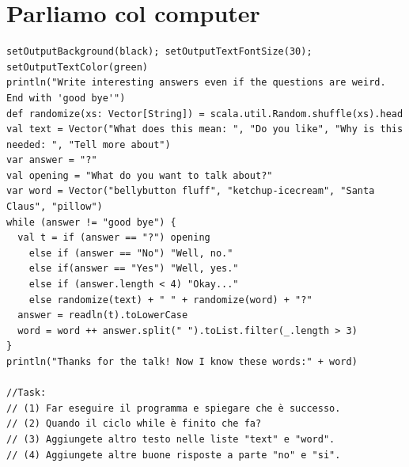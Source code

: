 \chapter{Parliamo col computer}
\begin{lstlisting}[basicstyle={\ttfamily\fontsize{13}{16}\selectfont},numbers=none]
setOutputBackground(black); setOutputTextFontSize(30); setOutputTextColor(green)
println("Write interesting answers even if the questions are weird. End with 'good bye'")
def randomize(xs: Vector[String]) = scala.util.Random.shuffle(xs).head
val text = Vector("What does this mean: ", "Do you like", "Why is this needed: ", "Tell more about")
var answer = "?"
val opening = "What do you want to talk about?"
var word = Vector("bellybutton fluff", "ketchup-icecream", "Santa Claus", "pillow") 
while (answer != "good bye") {
  val t = if (answer == "?") opening 
    else if (answer == "No") "Well, no." 
    else if(answer == "Yes") "Well, yes." 
    else if (answer.length < 4) "Okay..." 
    else randomize(text) + " " + randomize(word) + "?"
  answer = readln(t).toLowerCase
  word = word ++ answer.split(" ").toList.filter(_.length > 3) 
} 
println("Thanks for the talk! Now I know these words:" + word)

//Task:
// (1) Far eseguire il programma e spiegare che è successo.
// (2) Quando il ciclo while è finito che fa? 
// (3) Aggiungete altro testo nelle liste "text" e "word".
// (4) Aggiungete altre buone risposte a parte "no" e "si".
\end{lstlisting}
        
